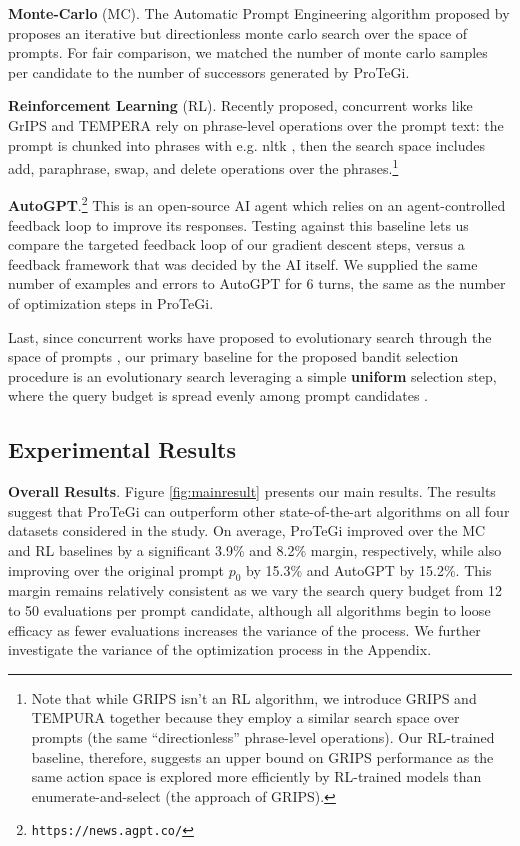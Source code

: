 \textbf{Monte-Carlo} (MC). The Automatic Prompt Engineering algorithm proposed by \citet{zhou2022large} proposes an iterative but directionless monte carlo search over the space of prompts. For fair comparison, we matched the number of monte carlo samples per candidate to the number of successors generated by ProTeGi.

\textbf{Reinforcement Learning} (RL). Recently proposed, concurrent works like GrIPS \cite{prasad2022grips} and TEMPERA \cite{zhang2023tempera} rely on phrase-level operations over the prompt text: the prompt is chunked into phrases with e.g. nltk \cite{bird2006nltk}, then the search space includes add, paraphrase, swap, and delete operations over the phrases.\footnote{Note that while GRIPS isn't an RL algorithm, we introduce GRIPS and TEMPURA together because they employ a similar search space over prompts (the same ``directionless'' phrase-level operations). Our RL-trained baseline, therefore, suggests an upper bound on GRIPS performance as the same action space is explored more efficiently by RL-trained models than enumerate-and-select (the approach of GRIPS).}

\textbf{AutoGPT}.\footnote{\texttt{https://news.agpt.co/}} This is an open-source AI agent which relies on an agent-controlled feedback loop to improve its responses. Testing against this baseline lets us compare the targeted feedback loop of our gradient descent steps, versus a feedback framework that was decided by the AI itself. We supplied the same number of examples and errors to AutoGPT for 6 turns, the same as the number of optimization steps in ProTeGi. 

Last, since concurrent works have proposed to evolutionary search through the space of prompts \cite{xu2022gps}, our primary baseline for the proposed bandit selection procedure is an evolutionary search leveraging a simple \textbf{uniform} selection step, where the query budget is spread evenly among prompt candidates \cite{prasad2022grips}.

\subsection{Experimental Results}
\label{sec:results}

\textbf{Overall Results}. Figure \ref{fig:mainresult} presents our main results. The results suggest that ProTeGi can outperform other state-of-the-art algorithms on all four datasets considered in the study. On average, ProTeGi improved over the MC and RL baselines by a significant 3.9\% and 8.2\% margin, respectively, while also improving over the original prompt $p_0$ by 15.3\% and AutoGPT by 15.2\%. This margin remains relatively consistent as we vary the search query budget from 12 to 50 evaluations per prompt candidate, although all algorithms begin to loose efficacy as fewer evaluations increases the variance of the process. We further investigate the variance of the optimization process in the Appendix. 

